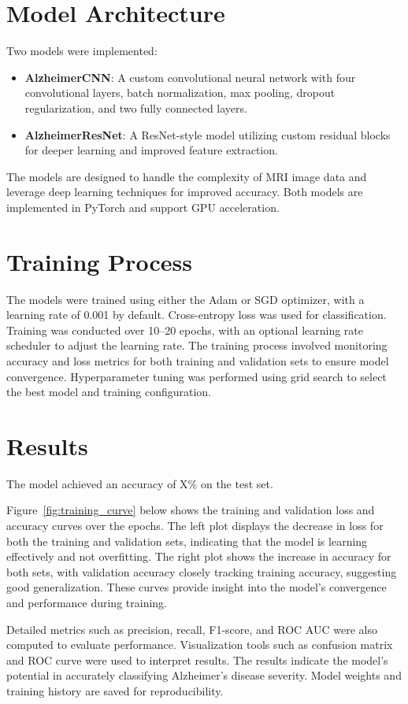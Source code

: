 \documentclass{article}
\begin{document}
\section{Model Architecture}
Two models were implemented:
\begin{itemize}
    \item \textbf{AlzheimerCNN}: A custom convolutional neural network with four convolutional layers, batch normalization, max pooling, dropout regularization, and two fully connected layers.
    \item \textbf{AlzheimerResNet}: A ResNet-style model utilizing custom residual blocks for deeper learning and improved feature extraction.
\end{itemize}
The models are designed to handle the complexity of MRI image data and leverage deep learning techniques for improved accuracy. Both models are implemented in PyTorch and support GPU acceleration.

\section{Training Process}
The models were trained using either the Adam or SGD optimizer, with a learning rate of 0.001 by default. Cross-entropy loss was used for classification. Training was conducted over 10--20 epochs, with an optional learning rate scheduler to adjust the learning rate. The training process involved monitoring accuracy and loss metrics for both training and validation sets to ensure model convergence. Hyperparameter tuning was performed using grid search to select the best model and training configuration.

\section{Results}
The model achieved an accuracy of X\% on the test set. 

Figure~\ref{fig:training_curve} below shows the training and validation loss and accuracy curves over the epochs. The left plot displays the decrease in loss for both the training and validation sets, indicating that the model is learning effectively and not overfitting. The right plot shows the increase in accuracy for both sets, with validation accuracy closely tracking training accuracy, suggesting good generalization. These curves provide insight into the model's convergence and performance during training.

Detailed metrics such as precision, recall, F1-score, and ROC AUC were also computed to evaluate performance. Visualization tools such as confusion matrix and ROC curve were used to interpret results. The results indicate the model's potential in accurately classifying Alzheimer's disease severity. Model weights and training history are saved for reproducibility.
\end{document}
